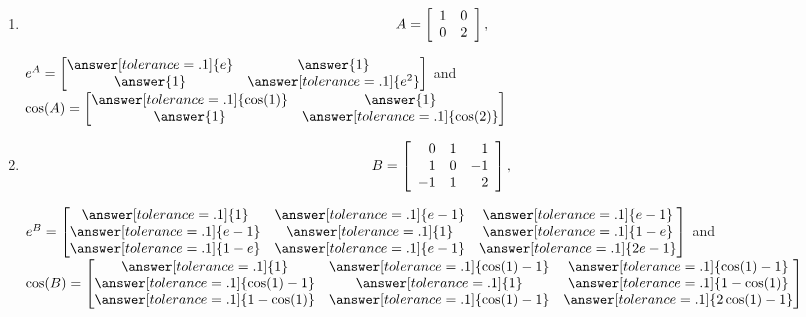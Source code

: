 \documentclass{ximera}
\begin{document}
\begin{problem}
  
  \begin{enumerate}
    \item $$A = \startmat{rr}
      1 & 0 \\
      0 & 2 \\
    \stopmat,$$
    
    $e^A=\begin{bmatrix}
      \answer[tolerance=.1]{e} & \answer{1}\\
      \answer{1} & \answer[tolerance=.1]{e^2}
    \end{bmatrix}$ and $\cos(A)=\begin{bmatrix}
      \answer[tolerance=.1]{\cos(1)} & \answer{1}\\
      \answer{1} & \answer[tolerance=.1]{\cos(2)}
    \end{bmatrix}$


    \item $$B = \startmat{rrr}
      0 & 1 & 1 \\
      1 & 0 & -1 \\
      -1 & 1 & 2 \\
    \stopmat,$$

    $e^B=\begin{bmatrix}
      \answer[tolerance=.1]{1}&\answer[tolerance=.1]{e-1}&\answer[tolerance=.1]{e-1}\\
      \answer[tolerance=.1]{e-1}& \answer[tolerance=.1]{1} & \answer[tolerance=.1]{1-e}\\
      \answer[tolerance=.1]{1-e}& \answer[tolerance=.1]{e-1} & \answer[tolerance=.1]{2e-1}
    \end{bmatrix}$ and $\cos(B)=\begin{bmatrix}
      \answer[tolerance=.1]{1}&\answer[tolerance=.1]{\cos(1)-1}&\answer[tolerance=.1]{\cos(1)-1}\\
      \answer[tolerance=.1]{\cos(1)-1}& \answer[tolerance=.1]{1} & \answer[tolerance=.1]{1-\cos(1)}\\
      \answer[tolerance=.1]{1-\cos(1)}& \answer[tolerance=.1]{\cos(1)-1} & \answer[tolerance=.1]{2\cos(1)-1}
    \end{bmatrix}$


  \end{enumerate}

  
\end{problem}
\end{document}
